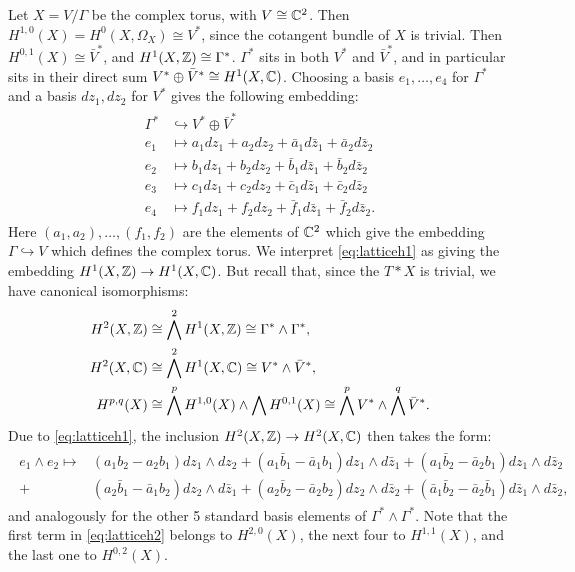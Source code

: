 \documentclass{article}
\begin{document}
Let $X = V/\Gamma$ be the complex torus, with $V \cong \mathbb{C}^2$. Then $H^{1,0}(X) = H^0(X,\Omega_X) \cong V^*$, since
the cotangent bundle of $X$ is trivial.
Then $H^{0,1}(X) \cong \bar V^*$, and $H^1(X,\mathbb{Z}) \cong \Gamma^*$. $\Gamma^*$ sits in both $V^*$ and $\bar V^*$,
and in particular sits in their direct sum $V^* \oplus \bar V^* \cong H^1(X,\mathbb{C})$. Choosing a basis $e_1, \dots,
e_4$ for $\Gamma^*$ and a basis $dz_1, dz_2$ for $V^*$ gives the following embedding:
\begin{align}
\label{eq:latticeh1}
\begin{split}
\Gamma^* &\hookrightarrow V^* \oplus \bar V^* \\
e_1 &\mapsto a_1 dz_1 + a_2 dz_2 + \bar a_1 d\bar z_1 + \bar a_2 d\bar z_2 \\
e_2 &\mapsto b_1 dz_1 + b_2 dz_2 + \bar b_1 d\bar z_1 + \bar b_2 d\bar z_2 \\
e_3 &\mapsto c_1 dz_1 + c_2 dz_2 + \bar c_1 d\bar z_1 + \bar c_2 d\bar z_2 \\
e_4 &\mapsto f_1 dz_1 + f_2 dz_2 + \bar f_1 d\bar z_1 + \bar f_2 d\bar z_2 .
\end{split}
\end{align}
Here $(a_1,a_2), \dots, (f_1,f_2)$ are the elements of $\mathbb{C}^2$ which give the embedding $\Gamma \hookrightarrow V$
which defines the complex torus. We interpret \ref{eq:latticeh1} as giving the embedding $H^1(X,\mathbb{Z}) \to H^1(X,\mathbb{C})$.
But recall that, since the $T*X$ is trivial, we have canonical isomorphisms:
\begin{align*}
H^2(X,\mathbb{Z}) &\cong \bigwedge^2 H^1(X,\mathbb{Z}) \cong \Gamma^* \wedge \Gamma^*, \\
H^2(X,\mathbb{C}) &\cong \bigwedge^2 H^1(X,\mathbb{C}) \cong V^* \wedge \bar V^*, \\
H^{p,q}(X) &\cong \bigwedge^p H^{1,0}(X) \wedge \bigwedge H^{0,1}(X) \cong \bigwedge^p V^* \wedge \bigwedge^q \bar V^*.
\end{align*}
Due to \ref{eq:latticeh1}, the inclusion $H^2(X,\mathbb{Z}) \to H^2(X,\mathbb{C})$ then takes the form:
\begin{align}
\label{eq:latticeh2}
\begin{split}
e_1 \wedge e_2 \mapsto& (a_1 b_2 - a_2 b_1) dz_1 \wedge dz_2 + (a_1 \bar b_1 - \bar a_1 b_1) dz_1 \wedge d\bar z_1
+ (a_1 \bar b_2 - \bar a_2 b_1) dz_1 \wedge d\bar z_2 \\
+& (a_2 \bar b_1 - \bar a_1 b_2) dz_2 \wedge d\bar z_1
+ (a_2 \bar b_2 - \bar a_2 b_2) dz_2 \wedge d\bar z_2 + (\bar a_1 \bar b_2 - \bar a_2 \bar b_1) d\bar z_1 \wedge d\bar z_2,
\end{split}
\end{align}
and analogously for the other 5 standard basis elements of $\Gamma^* \wedge \Gamma^*$. Note that the first term in
\ref{eq:latticeh2} belongs to $H^{2,0}(X)$, the next four to $H^{1,1}(X)$, and the last one to $H^{0,2}(X)$.
\end{document}

